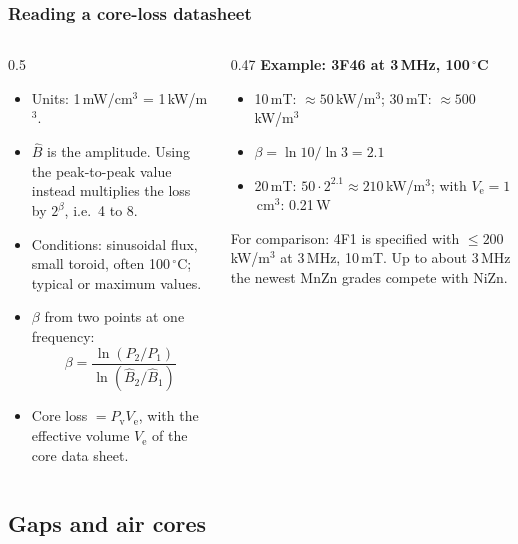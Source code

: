 \begin{frame}
	\frametitle{Reading a core-loss datasheet}
	\begin{columns}[T]
		\begin{column}{0.5\textwidth}
			\small
			\begin{itemize}
				\item Units: 1\,mW/cm$^3$ = 1\,kW/m$^3$.
				\item $\hat{B}$ is the amplitude. Using the peak-to-peak value instead multiplies the loss by $2^{\beta}$, i.e.\ 4 to 8.
				\item Conditions: sinusoidal flux, small toroid, often 100\,$^\circ$C; typical or maximum values.
				\item $\beta$ from two points at one frequency:
				      \begin{equation*}
					      \beta=\frac{\ln(P_2/P_1)}{\ln(\hat{B}_2/\hat{B}_1)}
				      \end{equation*}
				\item Core loss $=P_\mathrm{v}V_\mathrm{e}$, with the effective volume $V_\mathrm{e}$ of the core data sheet.
			\end{itemize}
		\end{column}
		\begin{column}{0.47\textwidth}
			\small
			\textbf{Example: 3F46 at 3\,MHz, 100\,$^\circ$C}
			\begin{itemize}
				\item 10\,mT: $\approx50$\,kW/m$^3$; 30\,mT: $\approx500$\,kW/m$^3$
				\item $\beta=\ln10/\ln3=2.1$
				\item 20\,mT: $50\cdot2^{2.1}\approx210$\,kW/m$^3$; with $V_\mathrm{e}=1$\,cm$^3$: 0.21\,W
			\end{itemize}
			For comparison: 4F1 is specified with $\leq200$\,kW/m$^3$ at 3\,MHz, 10\,mT. Up to about 3\,MHz the newest MnZn grades compete with NiZn.
		\end{column}
	\end{columns}
\end{frame}

\subsection{Gaps and air cores}

